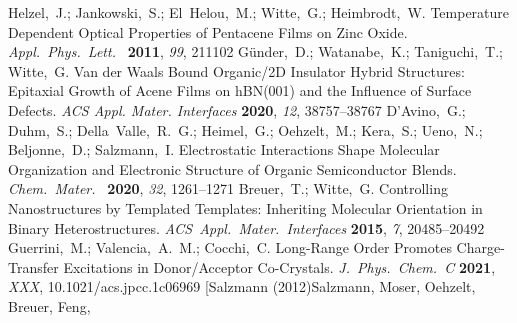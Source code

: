 \documentclass[journal=jpclcd,manuscript=letter]{achemso}
\begin{document}
\begin{mcitethebibliography}{51}
\mciteBstWouldAddEndPuncttrue
\mciteSetBstMidEndSepPunct{\mcitedefaultmidpunct}
{\mcitedefaultendpunct}{\mcitedefaultseppunct}\relax
\EndOfBibitem
{}
Helzel,~J.; Jankowski,~S.; El~Helou,~M.; Witte,~G.; Heimbrodt,~W. Temperature
  Dependent Optical Properties of Pentacene Films on Zinc Oxide.
  \emph{Appl.~Phys.~Lett.~} \textbf{2011}, \emph{99}, 211102\relax
\mciteBstWouldAddEndPuncttrue
\mciteSetBstMidEndSepPunct{\mcitedefaultmidpunct}
{\mcitedefaultendpunct}{\mcitedefaultseppunct}\relax
\EndOfBibitem
{}
G\"under,~D.; Watanabe,~K.; Taniguchi,~T.; Witte,~G. Van der Waals Bound
  Organic/2D Insulator Hybrid Structures: Epitaxial Growth of Acene Films on
  hBN(001) and the Influence of Surface Defects. \emph{ACS Appl. Mater.
  Interfaces} \textbf{2020}, \emph{12}, 38757--38767\relax
\mciteBstWouldAddEndPuncttrue
\mciteSetBstMidEndSepPunct{\mcitedefaultmidpunct}
{\mcitedefaultendpunct}{\mcitedefaultseppunct}\relax
\EndOfBibitem
{}
D’Avino,~G.; Duhm,~S.; Della~Valle,~R.~G.; Heimel,~G.; Oehzelt,~M.; Kera,~S.;
  Ueno,~N.; Beljonne,~D.; Salzmann,~I. Electrostatic Interactions Shape
  Molecular Organization and Electronic Structure of Organic Semiconductor
  Blends. \emph{Chem.~Mater.~} \textbf{2020}, \emph{32}, 1261--1271\relax
\mciteBstWouldAddEndPuncttrue
\mciteSetBstMidEndSepPunct{\mcitedefaultmidpunct}
{\mcitedefaultendpunct}{\mcitedefaultseppunct}\relax
\EndOfBibitem
{}
Breuer,~T.; Witte,~G. Controlling Nanostructures by Templated Templates:
  Inheriting Molecular Orientation in Binary Heterostructures.
  \emph{ACS~Appl.~Mater.~Interfaces} \textbf{2015}, \emph{7},
  20485--20492\relax
\mciteBstWouldAddEndPuncttrue
\mciteSetBstMidEndSepPunct{\mcitedefaultmidpunct}
{\mcitedefaultendpunct}{\mcitedefaultseppunct}\relax
\EndOfBibitem
{}
Guerrini,~M.; Valencia,~A.~M.; Cocchi,~C. Long-Range Order Promotes
  Charge-Transfer Excitations in Donor/Acceptor Co-Crystals.
  \emph{J.~Phys.~Chem.~C} \textbf{2021}, \emph{XXX},
  10.1021/acs.jpcc.1c06969\relax
\mciteBstWouldAddEndPuncttrue
\mciteSetBstMidEndSepPunct{\mcitedefaultmidpunct}
{\mcitedefaultendpunct}{\mcitedefaultseppunct}\relax
\EndOfBibitem
\bibitem[Salzmann (2012)Salzmann, Moser, Oehzelt, Breuer, Feng,

\end{mcitethebibliography}
\end{document}
